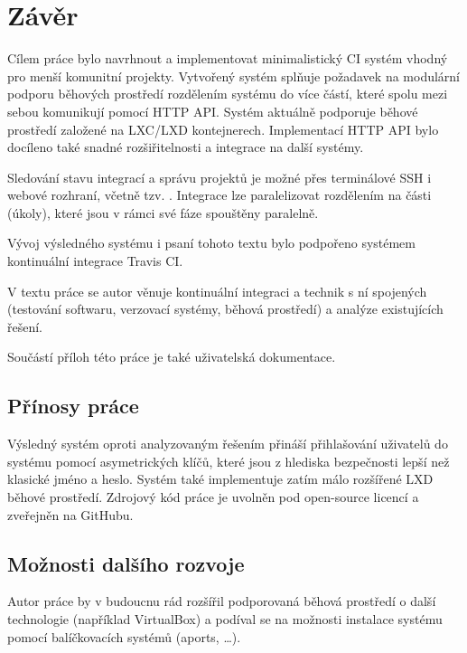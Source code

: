 \chapter{Závěr}

Cílem práce bylo navrhnout a implementovat minimalistický CI systém vhodný pro menší komunitní projekty.
Vytvořený systém splňuje požadavek na modulární podporu běhových prostředí rozdělením systému do více částí, které spolu mezi sebou komunikují pomocí HTTP API.
Systém aktuálně podporuje běhové prostředí založené na LXC/LXD kontejnerech.
Implementací HTTP API bylo docíleno také snadné rozšiřitelnosti a integrace na další systémy.

Sledování stavu integrací a správu projektů je možné přes terminálové SSH i webové rozhraní, včetně tzv. .
Integrace lze paralelizovat rozdělením na části (úkoly), které jsou v rámci své fáze spouštěny paralelně.

Vývoj výsledného systému i psaní tohoto textu bylo podpořeno systémem kontinuální integrace Travis CI.

V textu práce se autor věnuje kontinuální integraci a technik s ní spojených (testování softwaru, verzovací systémy, běhová prostředí) a analýze existujících řešení.

Součástí příloh této práce je také uživatelská dokumentace.

\section{Přínosy práce}

Výsledný systém oproti analyzovaným řešením přináší přihlašování uživatelů do systému pomocí asymetrických klíčů, které jsou z hlediska bezpečnosti lepší než klasické jméno a heslo.
Systém také implementuje zatím málo rozšířené LXD běhové prostředí.
Zdrojový kód práce je uvolněn pod open-source licencí a zveřejněn na GitHubu.

\section{Možnosti dalšího rozvoje}

Autor práce by v budoucnu rád rozšířil podporovaná běhová prostředí o další technologie (například VirtualBox) a podíval se na možnosti instalace systému pomocí balíčkovacích systémů (aports, \ldots).